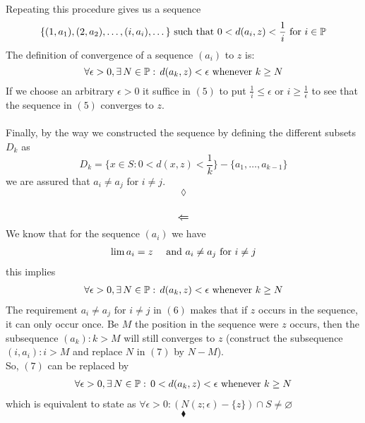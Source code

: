  Repeating this procedure gives us a sequence
  \begin{align}
 \{(1,a_1), (2,a_2),\dots, (i,a_i),\dots\}\text{ such that }0< d(a_i,z)<\frac{1}{i}\text{ for } i\in \mathbb{P} 
 \end{align}
The definition of convergence of a sequence $(a_i)$ to $z$  is:
$$\forall\epsilon > 0, \exists\, N\in\mathbb{P}:\, d(a_k,z) <\epsilon \text{ whenever } k \geq N $$
If we choose an arbitrary $\epsilon>0$ it suffice in $(5)$ to put $\frac{1}{i}\leq \epsilon$ or $i\geq \frac{1}{\epsilon}$ to see that the sequence in $(5)$ converges to $z$.\\\\
Finally, by the way we constructed  the sequence by defining the different subsets $D_k$ as $$D_k=\{ x\in S: 0<d(x,z)<\frac{1}{k}\}-\{a_1,\dots,a_{k-1}\}  $$ we are assured that $a_i\neq a_j$ for $i\neq j$.
$$\lozenge$$\\
$$\mathbf{\mathlarger{\Leftarrow}}$$
We know that for the sequence $(a_i)$ we have 
\begin{align}
\lim a_i= z\quad\text{ and } a_i\neq a_j \text{ for } i\neq j
\end{align}
this implies
\begin{align}
\forall\epsilon > 0, \exists\, N\in\mathbb{P}:\, d(a_k,z) <\epsilon \text{ whenever } k \geq N
\end{align}
The requirement $a_i\neq a_j \text{ for } i\neq j$ in $(6)$ makes that if $z$ occurs in the sequence, it can only occur once. Be $M$ the position in the sequence were $z$ occurs, then the subsequence $(a_k):k> M$ will still converges to $z$ (construct the subsequence $(i,a_i): i>M$ and replace $N$ in $(7)$ by $N-M$).\\
So, $(7)$ can be replaced by 
\begin{align}
\forall\epsilon > 0, \exists\, N\in\mathbb{P}:\, 0< d(a_k,z) <\epsilon \text{ whenever } k \geq N
\end{align}
which is equivalent to state as 
$\forall \epsilon >0: \left(N(z;\epsilon)-\{z\}\right)\cap S\neq\varnothing$
$$\blacklozenge$$\\


